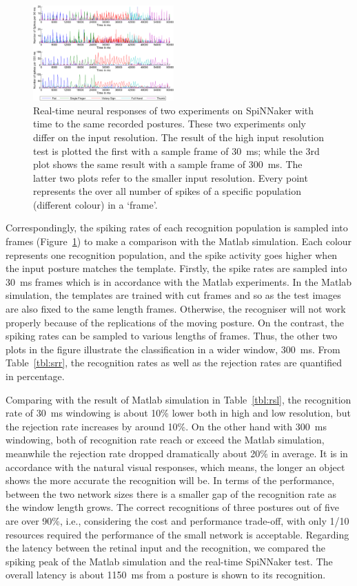 \documentclass[journal]{journal}
\begin{document}
\begin{figure}
\centering
	\includegraphics[width=0.48\textwidth]{pics/rateSpiNN.pdf}
	\caption{Real-time neural responses of two experiments on SpiNNaker with time to the same recorded postures.
	These two experiments only differ on the input resolution.
	The result of the high input resolution test is plotted the first with a sample frame of 30~ms; 
	while the 3rd plot shows the same result with a sample frame of 300~ms.
	The latter two plots refer to the smaller input resolution.
	Every point represents the over all number of spikes of a specific population (different colour) in a `frame'.
	}
	\label{fig:spikerec}
\end{figure}

Correspondingly, the spiking rates of each recognition population is sampled into frames (Figure~\ref{fig:spikerec}) to make a comparison with the Matlab simulation. 
Each colour represents one recognition population, and the spike activity goes higher when the input posture matches the template. 
Firstly, the spike rates are sampled into 30~ms frames which is in accordance with the Matlab experiments.
In the Matlab simulation, the templates are trained with cut frames and so as the test images are also fixed to the same length frames.
Otherwise, the recogniser will not work properly because of the replications of the moving posture.
On the contrast, the spiking rates can be sampled to various lengths of frames.
Thus, the other two plots in the figure illustrate the classification in a wider window, 300~ms.
From Table~\ref{tbl:srr}, the recognition rates as well as the rejection rates are quantified in percentage.

Comparing with the result of Matlab simulation in Table~\ref{tbl:rsl}, the recognition rate of 30~ms windowing is about 10\% lower both in high and low resolution, but the rejection rate increases by around 10\%. 
On the other hand with 300~ms windowing, both of recognition rate reach or exceed the Matlab simulation, meanwhile the rejection rate dropped dramatically about 20\% in average.
It is in accordance with the natural visual responses, which means, the longer an object shows the more accurate the recognition will be.
In terms of the performance, between the two network sizes there is a smaller gap of the recognition rate as the window length grows.
The correct recognitions of three postures out of five are over 90\%, i.e., considering the cost and performance trade-off, with only 1/10 resources required the performance of the small network is acceptable.
Regarding the latency between the retinal input and the recognition, we compared the spiking peak of the Matlab simulation and the real-time SpiNNaker test.
The overall latency is about 1150~ms from a posture is shown to its recognition. 
\end{document}
